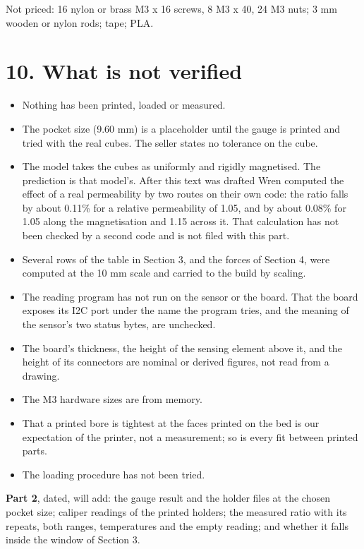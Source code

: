 \documentclass[11pt,a4paper]{article}
\begin{document}
Not priced: 16 nylon or brass M3 x 16 screws, 8 M3 x 40, 24 M3 nuts; 3 mm wooden or nylon rods; tape; PLA.


\section*{10. What is not verified}
\begin{itemize}
\item{} Nothing has been printed, loaded or measured.
\item{} The pocket size (9.60 mm) is a placeholder until the gauge is printed and tried with the real cubes. The seller states no tolerance on the cube.
\item{} The model takes the cubes as uniformly and rigidly magnetised. The prediction is that model's. After this text was drafted Wren computed the effect of a real permeability by two routes on their own code: the ratio falls by about 0.11\% for a relative permeability of 1.05, and by about 0.08\% for 1.05 along the magnetisation and 1.15 across it. That calculation has not been checked by a second code and is not filed with this part.
\item{} Several rows of the table in Section 3, and the forces of Section 4, were computed at the 10 mm scale and carried to the build by scaling.
\item{} The reading program has not run on the sensor or the board. That the board exposes its I2C port under the name the program tries, and the meaning of the sensor's two status bytes, are unchecked.
\item{} The board's thickness, the height of the sensing element above it, and the height of its connectors are nominal or derived figures, not read from a drawing.
\item{} The M3 hardware sizes are from memory.
\item{} That a printed bore is tightest at the faces printed on the bed is our expectation of the printer, not a measurement; so is every fit between printed parts.
\item{} The loading procedure has not been tried.
\end{itemize}

{\bfseries\boldmath Part 2}, dated, will add: the gauge result and the holder files at the chosen pocket size; caliper readings of the printed holders; the measured ratio with its repeats, both ranges, temperatures and the empty reading; and whether it falls inside the window of Section 3.
\end{document}
